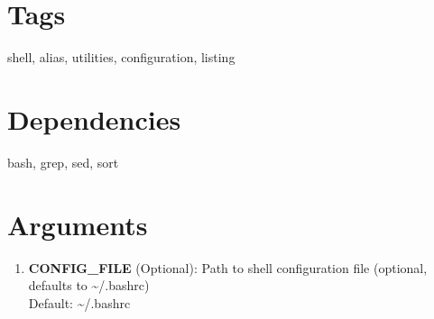 \documentclass{article}
\begin{document}
\section*{Tags}
shell, alias, utilities, configuration, listing

\section*{Dependencies}
bash, grep, sed, sort


\section*{Arguments}
\begin{enumerate}
  \item \textbf{CONFIG\_FILE} (Optional): Path to shell configuration file (optional, defaults to \textasciitilde{}/.bashrc) \\ Default: \textasciitilde{}/.bashrc
\end{enumerate}
\end{document}
